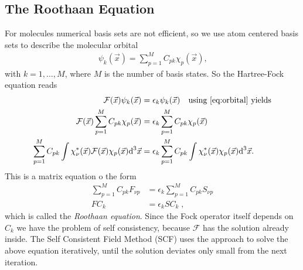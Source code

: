 \documentclass[10pt,a4paper]{article} %
\begin{document}
    \subsection{The Roothaan Equation}
    For molecules numerical basis sets are not efficient, so we use atom centered basis sets to describe the molecular orbital
    \begin{align}\label{eq:orbital}
    \psi_k(\vec{x}) = \sum_{p=1}^M C_{pk} \chi_p (\vec{x})\text{,}
    \end{align}
    with $k = 1,\dots, M$, where $M$ is the number of basis states.
    So the Hartree-Fock equation reads
    \begin{align*}
    \mathcal{F} (\vec{x})   \psi_k(\vec{x}) &= \epsilon_k    \psi_k(\vec{x}) \quad \text{using \ref{eq:orbital} yields}\\
    \mathcal{F} (\vec{x})  \sum_{p=1}^M C_{pk} \chi_p (\vec{x}) &= \epsilon_k \sum_{p=1}^M C_{pk} \chi_p (\vec{x})\\
     \sum_{p=1}^M C_{pk} \int \chi_\nu^*(\vec{x})  \mathcal{F} (\vec{x}) \chi_p(\vec{x})\text{d}^3 \vec{x} & =  \epsilon_k  \sum_{p=1}^M C_{pk} \int \chi_\nu^*(\vec{x}) \chi_p(\vec{x})\text{d}^3 \vec{x}   \text{.}
    \end{align*}
    This is a matrix equation o the form
    \begin{align*}
    \sum_{p=1}^M C_{pk} F_{\nu p}  &= \epsilon_k \sum_{p=1}^M C_{pk} S_{\nu p}\\
    F C_k &= \epsilon_k S C_k \; \text{,}
    \end{align*} which is called the \textit{Roothaan equation}.
    Since the Fock operator itself depends on $C_k$ we have the problem of self consistency, because $\mathcal{F}$ has the solution already inside. The Self Consistent Field Method (SCF) uses the approach to solve the above equation iteratively, until the solution deviates only small from the next iteration.
    
    
    \nocite{*}
    
    
\end{document}
